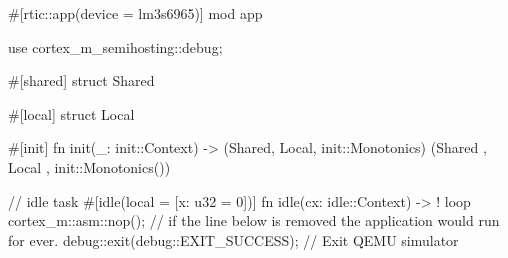 #[rtic::app(device = lm3s6965)]
mod app {
    use cortex_m_semihosting::debug;

    #[shared]
    struct Shared {}

    #[local]
    struct Local {}

    #[init]
    fn init(_: init::Context) -> (Shared, Local, init::Monotonics) {
        (Shared {}, Local {}, init::Monotonics())
    }

    // idle task 
    #[idle(local = [x: u32 = 0])]
    fn idle(cx: idle::Context) -> ! {
        loop {
            cortex_m::asm::nop();
            // if the line below is removed the application would run for ever.
            debug::exit(debug::EXIT_SUCCESS); // Exit QEMU simulator
        }
    }
}
